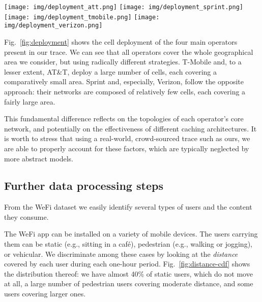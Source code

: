\documentclass{sig-alternate-05-2015}
\newcommand{\Fig}[1]{Fig.~\ref{fig:#1}}
\begin{document}
\begin{figure*}[]
\centering
\texttt{[image: img/deployment\_att.png]}
\texttt{[image: img/deployment\_sprint.png]}
\texttt{[image: img/deployment\_tmobile.png]}
\texttt{[image: img/deployment\_verizon.png]}
\caption{
Left to right: deployment for AT\&T, Sprint, T-Mobile, Verizon. Each dot represents a cell, and the size of dots is proportional to the coverage area thereof, as estimated from the location of users reporting the same cell ID.
\label{fig:deployment}
\vspace*{-3mm}
} \end{figure*}

\Fig{deployment} shows the cell deployment of the four main operators present in our trace. We can see that all operators cover the whole geographical area we consider, but using radically different strategies. T-Mobile and, to a lesser extent, AT\&T, deploy a large number of cells, each covering a comparatively small area. Sprint and, especially, Verizon, follow the opposite approach: their networks are composed of relatively few cells, each covering a fairly large area.

This fundamental difference reflects on the topologies of each operator's core network, and potentially on the effectiveness of different caching architectures. It is worth to stress that using a real-world, crowd-sourced trace such as ours, we are able to properly account for these factors, which are typically neglected by more abstract models.

\subsection{Further data processing steps}
\label{sec:process}

From the WeFi dataset we easily identify several types of users and the content they consume.

The WeFi app can be installed on a variety of mobile devices. The users carrying them can be static (e.g., sitting in a caf\'{e}), pedestrian (e.g., walking or jogging), or vehicular. We discriminate among these cases by looking at the {\em distance} covered by each user during each one-hour period. \Fig{distance-cdf} shows the distribution thereof: we have almost 40\% of static users, which do not move at all, a large number of pedestrian users covering moderate distance, and some users covering larger ones.
\end{document}
